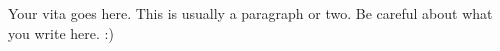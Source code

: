 
Your vita goes here. This is usually a paragraph or two. Be careful about what you write here. :)

\lipsum[1]